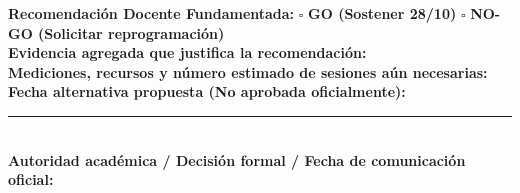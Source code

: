 \documentclass[10pt, a4paper]{article}
\begin{document}
\begin{tcolorbox}[colback=warnbg, colframe=red!75!black, title=\textbf{Acta de Recomendación sobre la Defensa Propuesta del 28/10 (Sujeta a Aprobación)}]
    \footnotesize
    \textbf{Recomendación Docente Fundamentada:} \quad $\square$ \textbf{GO (Sostener 28/10)} \qquad $\square$ \textbf{NO-GO (Solicitar reprogramación)} \\[0.15cm]
    \textbf{Evidencia agregada que justifica la recomendación:} \hrulefill \\[0.15cm]
    \textbf{Mediciones, recursos y número estimado de sesiones aún necesarias:} \hrulefill \\[0.15cm]
    \textbf{Fecha alternativa propuesta (No aprobada oficialmente):} \rule{4.5cm}{0.4pt} \\[0.15cm]
    \textbf{Autoridad académica / Decisión formal / Fecha de comunicación oficial:} \hrulefill
\end{tcolorbox}
\end{document}

